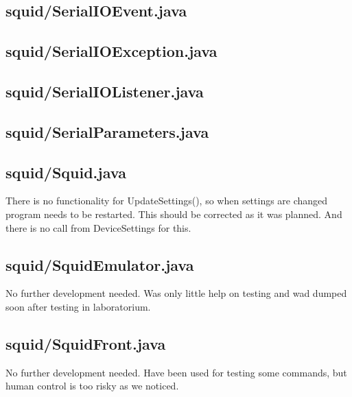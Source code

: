 \subsection{squid/SerialIOEvent.java}

\subsection{squid/SerialIOException.java}

\subsection{squid/SerialIOListener.java}

\subsection{squid/SerialParameters.java}

\subsection{squid/Squid.java}

There is no functionality for UpdateSettings(), so when settings are changed program needs to be restarted. This should be corrected as it was planned. And there is no call from DeviceSettings for this.

\subsection{squid/SquidEmulator.java}

No further development needed. Was only little help on testing and wad dumped soon after testing in laboratorium.

\subsection{squid/SquidFront.java}

No further development needed. Have been used for testing some commands, but human control is too risky as we noticed.

